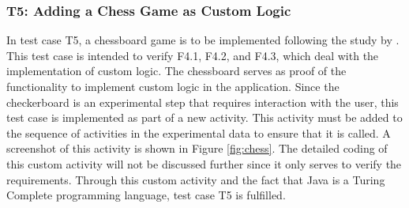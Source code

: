 \newpage



\subsubsection*{T5: Adding a Chess Game as Custom Logic}

In test case T5, a chessboard game is to be implemented following the study by \cite{Krakowski.2022}. This test case is intended to verify F4.1, F4.2, and F4.3, which deal with the implementation of custom logic. The chessboard serves as proof of the functionality to implement custom logic in the application. Since the checkerboard is an experimental step that requires interaction with the user, this test case is implemented as part of a new activity. This activity must be added to the sequence of activities in the experimental data to ensure that it is called. A screenshot of this activity is shown in Figure \ref{fig:chess}. The detailed coding of this custom activity will not be discussed further since it only serves to verify the requirements. Through this custom activity and the fact that Java is a Turing Complete programming language, test case T5 is fulfilled.



